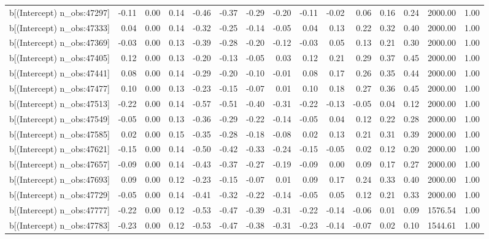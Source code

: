 \begin{table}[ht]
\begin{tabular}{rrrrrrrrrrrrrrr}
  b[(Intercept) n\_obs:47297] & -0.11 & 0.00 & 0.14 & -0.46 & -0.37 & -0.29 & -0.20 & -0.11 & -0.02 & 0.06 & 0.16 & 0.24 & 2000.00 & 1.00 \\ 
  b[(Intercept) n\_obs:47333] & 0.04 & 0.00 & 0.14 & -0.32 & -0.25 & -0.14 & -0.05 & 0.04 & 0.13 & 0.22 & 0.32 & 0.40 & 2000.00 & 1.00 \\ 
  b[(Intercept) n\_obs:47369] & -0.03 & 0.00 & 0.13 & -0.39 & -0.28 & -0.20 & -0.12 & -0.03 & 0.05 & 0.13 & 0.21 & 0.30 & 2000.00 & 1.00 \\ 
  b[(Intercept) n\_obs:47405] & 0.12 & 0.00 & 0.13 & -0.20 & -0.13 & -0.05 & 0.03 & 0.12 & 0.21 & 0.29 & 0.37 & 0.45 & 2000.00 & 1.00 \\ 
  b[(Intercept) n\_obs:47441] & 0.08 & 0.00 & 0.14 & -0.29 & -0.20 & -0.10 & -0.01 & 0.08 & 0.17 & 0.26 & 0.35 & 0.44 & 2000.00 & 1.00 \\ 
  b[(Intercept) n\_obs:47477] & 0.10 & 0.00 & 0.13 & -0.23 & -0.15 & -0.07 & 0.01 & 0.10 & 0.18 & 0.27 & 0.36 & 0.45 & 2000.00 & 1.00 \\ 
  b[(Intercept) n\_obs:47513] & -0.22 & 0.00 & 0.14 & -0.57 & -0.51 & -0.40 & -0.31 & -0.22 & -0.13 & -0.05 & 0.04 & 0.12 & 2000.00 & 1.00 \\ 
  b[(Intercept) n\_obs:47549] & -0.05 & 0.00 & 0.13 & -0.36 & -0.29 & -0.22 & -0.14 & -0.05 & 0.04 & 0.12 & 0.22 & 0.28 & 2000.00 & 1.00 \\ 
  b[(Intercept) n\_obs:47585] & 0.02 & 0.00 & 0.15 & -0.35 & -0.28 & -0.18 & -0.08 & 0.02 & 0.13 & 0.21 & 0.31 & 0.39 & 2000.00 & 1.00 \\ 
  b[(Intercept) n\_obs:47621] & -0.15 & 0.00 & 0.14 & -0.50 & -0.42 & -0.33 & -0.24 & -0.15 & -0.05 & 0.02 & 0.12 & 0.20 & 2000.00 & 1.00 \\ 
  b[(Intercept) n\_obs:47657] & -0.09 & 0.00 & 0.14 & -0.43 & -0.37 & -0.27 & -0.19 & -0.09 & 0.00 & 0.09 & 0.17 & 0.27 & 2000.00 & 1.00 \\ 
  b[(Intercept) n\_obs:47693] & 0.09 & 0.00 & 0.12 & -0.23 & -0.15 & -0.07 & 0.01 & 0.09 & 0.17 & 0.24 & 0.33 & 0.40 & 2000.00 & 1.00 \\ 
  b[(Intercept) n\_obs:47729] & -0.05 & 0.00 & 0.14 & -0.41 & -0.32 & -0.22 & -0.14 & -0.05 & 0.05 & 0.12 & 0.21 & 0.33 & 2000.00 & 1.00 \\ 
  b[(Intercept) n\_obs:47777] & -0.22 & 0.00 & 0.12 & -0.53 & -0.47 & -0.39 & -0.31 & -0.22 & -0.14 & -0.06 & 0.01 & 0.09 & 1576.54 & 1.00 \\ 
  b[(Intercept) n\_obs:47783] & -0.23 & 0.00 & 0.12 & -0.53 & -0.47 & -0.38 & -0.31 & -0.23 & -0.14 & -0.07 & 0.02 & 0.10 & 1544.61 & 1.00 \\ 

\end{tabular}
\end{table}
